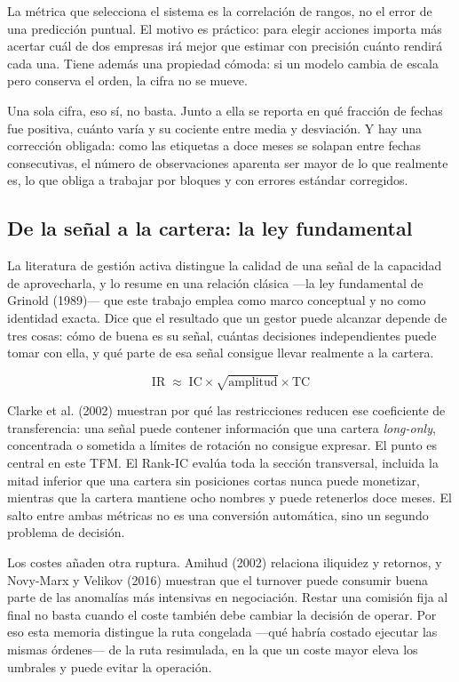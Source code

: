La métrica que selecciona el sistema es la correlación de rangos, no el error de una predicción
puntual. El motivo es práctico: para elegir acciones importa más acertar cuál de dos empresas irá
mejor que estimar con precisión cuánto rendirá cada una. Tiene además una propiedad cómoda: si un
modelo cambia de escala pero conserva el orden, la cifra no se mueve.

Una sola cifra, eso sí, no basta. Junto a ella se reporta en qué fracción de fechas fue positiva,
cuánto varía y su cociente entre media y desviación. Y hay una corrección obligada: como las
etiquetas a doce meses se solapan entre fechas consecutivas, el número de observaciones aparenta ser
mayor de lo que realmente es, lo que obliga a trabajar por bloques y con errores estándar
corregidos.

\subsection{De la señal a la cartera: la ley fundamental}

La literatura de gestión activa distingue la calidad de una señal de la capacidad de aprovecharla, y lo resume en una relación clásica ---la ley fundamental de Grinold (1989)--- que
este trabajo emplea como marco conceptual y no como identidad exacta. Dice que el resultado que un
gestor puede alcanzar depende de tres cosas: cómo de buena es su señal, cuántas decisiones
independientes puede tomar con ella, y qué parte de esa señal consigue llevar realmente a la
cartera.

\[
  \text{IR} \;\approx\; \text{IC} \times \sqrt{\text{amplitud}} \times \text{TC}
\]

Clarke et al. (2002) muestran por qué las restricciones reducen ese coeficiente de transferencia:
una señal puede contener información que una cartera \textit{long-only}, concentrada o sometida a
límites de rotación no consigue expresar. El punto es central en este TFM. El Rank-IC evalúa toda la
sección transversal, incluida la mitad inferior que una cartera sin posiciones cortas nunca puede
monetizar, mientras que la cartera mantiene ocho nombres y puede retenerlos doce meses. El salto
entre ambas métricas no es una conversión automática, sino un segundo problema de decisión.

Los costes añaden otra ruptura. Amihud (2002) relaciona iliquidez y retornos, y Novy-Marx y Velikov
(2016) muestran que el turnover puede consumir buena parte de las anomalías más intensivas en
negociación. Restar una comisión fija al final no basta cuando el coste también debe cambiar la
decisión de operar. Por eso esta memoria distingue la ruta congelada ---qué habría costado ejecutar
las mismas órdenes--- de la ruta resimulada, en la que un coste mayor eleva los umbrales y puede
evitar la operación.


